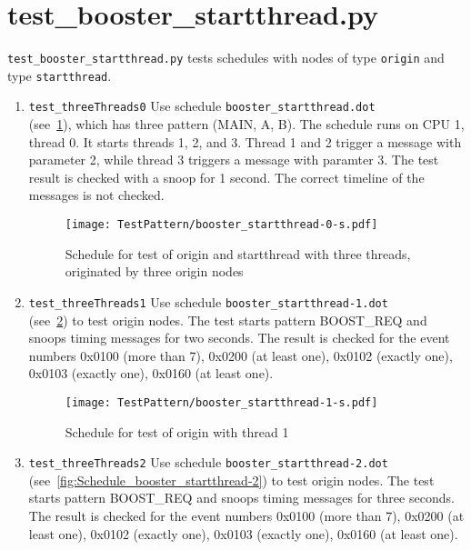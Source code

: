 \documentclass[12pt,a4paper]{report}
\begin{document}
\section{test\_booster\_startthread.py}
\texttt{test\_booster\_startthread.py} tests schedules with nodes of
type \texttt{origin} and type \texttt{startthread}.
\begin{enumerate}
\item \texttt{test\_threeThreads0}
Use schedule \texttt{booster\_startthread.dot} \\
 (see~\ref{fig:Schedule_booster_startthread-0}),
which has three pattern (MAIN, A, B). The schedule runs on CPU 1, thread 0.
It starts threads 1, 2, and 3. Thread 1 and 2 trigger a message with parameter 2,
while thread 3 triggers a message with paramter 3. The test result is
checked with a snoop for 1 second. The correct timeline of the messages
is not checked.
    \begin{figure}
        \centering
        \texttt{[image: TestPattern/booster\_startthread-0-s.pdf]}
        \caption{Schedule for test of origin and startthread with three
        threads, originated by three origin nodes}
        \label{fig:Schedule_booster_startthread-0}
    \end{figure}
\item \texttt{test\_threeThreads1}
Use schedule \texttt{booster\_startthread-1.dot} \\
(see~\ref{fig:Schedule_booster_startthread-1}) to test
origin nodes. The test starts pattern BOOST\_REQ and snoops timing messages
for two seconds. The result is checked for the event numbers
0x0100 (more than 7), 0x0200 (at least one), 0x0102 (exactly one),
0x0103 (exactly one), 0x0160 (at least one).
    \begin{figure}
        \centering
        \texttt{[image: TestPattern/booster\_startthread-1-s.pdf]}
        \caption{Schedule for test of origin with thread 1}
        \label{fig:Schedule_booster_startthread-1}
    \end{figure}
\item \texttt{test\_threeThreads2}
Use schedule \texttt{booster\_startthread-2.dot} \\
(see~\ref{fig:Schedule_booster_startthread-2}) to test
origin nodes. The test starts pattern BOOST\_REQ and snoops timing messages
for three seconds. The result is checked for the event numbers
0x0100 (more than 7), 0x0200 (at least one), 0x0102 (exactly one),
0x0103 (exactly one), 0x0160 (at least one).

\end{enumerate}
\end{document}
